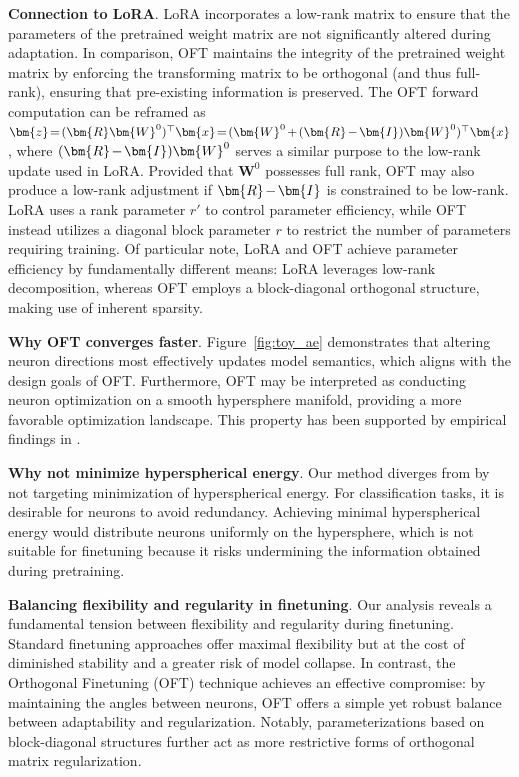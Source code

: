\textbf{Connection to LoRA}. LoRA incorporates a low-rank matrix to ensure that the parameters of the pretrained weight matrix are not significantly altered during adaptation. In comparison, OFT maintains the integrity of the pretrained weight matrix by enforcing the transforming matrix to be orthogonal (and thus full-rank), ensuring that pre-existing information is preserved. The OFT forward computation can be reframed as $\thickmuskip=2mu \medmuskip=2mu \bm{z}=(\bm{R}\bm{W}^0)^\top\bm{x}=(\bm{W}^0+(\bm{R}-\bm{I})\bm{W}^0)^\top\bm{x}$, where $\thickmuskip=2mu \medmuskip=2mu (\bm{R}-\bm{I})\bm{W}^0$ serves a similar purpose to the low-rank update used in LoRA. Provided that $\bm{W}^0$ possesses full rank, OFT may also produce a low-rank adjustment if $\thickmuskip=2mu \medmuskip=2mu \bm{R}-\bm{I}$ is constrained to be low-rank. LoRA uses a rank parameter $r'$ to control parameter efficiency, while OFT instead utilizes a diagonal block parameter $r$ to restrict the number of parameters requiring training. Of particular note, LoRA and OFT achieve parameter efficiency by fundamentally different means: LoRA leverages low-rank decomposition, whereas OFT employs a block-diagonal orthogonal structure, making use of inherent sparsity.

\textbf{Why OFT converges faster}. Figure~\ref{fig:toy_ae} demonstrates that altering neuron directions most effectively updates model semantics, which aligns with the design goals of OFT. Furthermore, OFT may be interpreted as conducting neuron optimization on a smooth hypersphere manifold, providing a more favorable optimization landscape. This property has been supported by empirical findings in \cite{liu2021orthogonal}.

\textbf{Why not minimize hyperspherical energy}. Our method diverges from \cite{liu2021orthogonal} by not targeting minimization of hyperspherical energy. For classification tasks, it is desirable for neurons to avoid redundancy. Achieving minimal hyperspherical energy would distribute neurons uniformly on the hypersphere, which is not suitable for finetuning because it risks undermining the information obtained during pretraining.

\textbf{Balancing flexibility and regularity in finetuning}. Our analysis reveals a fundamental tension between flexibility and regularity during finetuning. Standard finetuning approaches offer maximal flexibility but at the cost of diminished stability and a greater risk of model collapse. In contrast, the Orthogonal Finetuning (OFT) technique achieves an effective compromise: by maintaining the angles between neurons, OFT offers a simple yet robust balance between adaptability and regularization. Notably, parameterizations based on block-diagonal structures further act as more restrictive forms of orthogonal matrix regularization.

